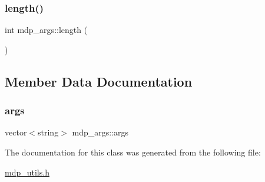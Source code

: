 \mbox{\label{classmdp__args_a58c20cc81ff32faccb3d0e6391918ab5}} 
\subsubsection{\texorpdfstring{length()}{length()}}
{\footnotesize\ttfamily int mdp\+\_\+args\+::length (\begin{DoxyParamCaption}{ }\end{DoxyParamCaption})\hspace{0.3cm}{\ttfamily [inline]}}



\subsection{Member Data Documentation}
\mbox{\label{classmdp__args_abdf152b512b21a675d83e001023b8fad}} 
\subsubsection{\texorpdfstring{args}{args}}
{\footnotesize\ttfamily vector$<$string$>$ mdp\+\_\+args\+::args}



The documentation for this class was generated from the following file\+:\begin{DoxyCompactItemize}
\item 
\hyperlink{mdp__utils_8h}{mdp\+\_\+utils.\+h}\end{DoxyCompactItemize}
